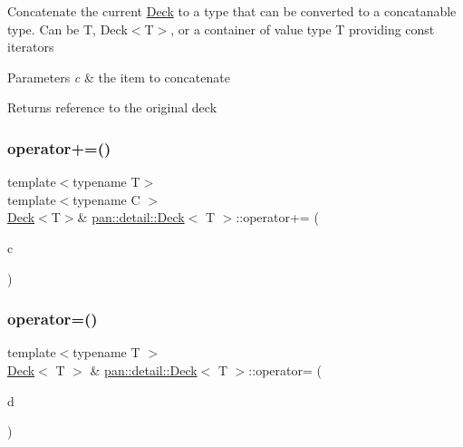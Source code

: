 Concatenate the current \hyperlink{classpan_1_1detail_1_1_deck}{Deck} to a type that can be converted to a concatanable type. Can be T, Deck$<$\+T$>$, or a container of value type T providing const iterators 
\begin{DoxyParams}{Parameters}
{\em c} & the item to concatenate \\
\hline
\end{DoxyParams}
\begin{DoxyReturn}{Returns}
reference to the original deck 
\end{DoxyReturn}
\mbox{\label{classpan_1_1detail_1_1_deck_af541a86b4d96c99ca748a80a4ccf4196}} 
\subsubsection{\texorpdfstring{operator+=()}{operator+=()}\hspace{0.1cm}{\footnotesize\ttfamily [2/2]}}
{\footnotesize\ttfamily template$<$typename T$>$ \\
template$<$typename C $>$ \\
\hyperlink{classpan_1_1detail_1_1_deck}{Deck}$<$T$>$\& \hyperlink{classpan_1_1detail_1_1_deck}{pan\+::detail\+::\+Deck}$<$ T $>$\+::operator+= (\begin{DoxyParamCaption}\item[{const C \&}]{c }\end{DoxyParamCaption})}

\mbox{\label{classpan_1_1detail_1_1_deck_a8a33b4bc1c46e71b918c39e088d5dee9}} 
\subsubsection{\texorpdfstring{operator=()}{operator=()}\hspace{0.1cm}{\footnotesize\ttfamily [1/2]}}
{\footnotesize\ttfamily template$<$typename T $>$ \\
\hyperlink{classpan_1_1detail_1_1_deck}{Deck}$<$ T $>$ \& \hyperlink{classpan_1_1detail_1_1_deck}{pan\+::detail\+::\+Deck}$<$ T $>$\+::operator= (\begin{DoxyParamCaption}\item[{const \hyperlink{classpan_1_1detail_1_1_deck}{Deck}$<$ T $>$ \&}]{d }\end{DoxyParamCaption})}

